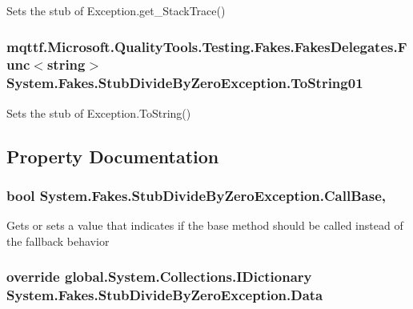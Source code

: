 Sets the stub of Exception.\-get\-\_\-\-Stack\-Trace()

\hypertarget{class_system_1_1_fakes_1_1_stub_divide_by_zero_exception_aeb8a3ab45380ba167acf6766766ca596}{
\subsubsection[{To\-String01}]{\setlength{\rightskip}{0pt plus 5cm}mqttf.\-Microsoft.\-Quality\-Tools.\-Testing.\-Fakes.\-Fakes\-Delegates.\-Func$<$string$>$ System.\-Fakes.\-Stub\-Divide\-By\-Zero\-Exception.\-To\-String01}}\label{class_system_1_1_fakes_1_1_stub_divide_by_zero_exception_aeb8a3ab45380ba167acf6766766ca596}


Sets the stub of Exception.\-To\-String()



\subsection{Property Documentation}
\hypertarget{class_system_1_1_fakes_1_1_stub_divide_by_zero_exception_a241ea289fc72c08d879994894e726743}{
\subsubsection[{Call\-Base}]{\setlength{\rightskip}{0pt plus 5cm}bool System.\-Fakes.\-Stub\-Divide\-By\-Zero\-Exception.\-Call\-Base\hspace{0.3cm}{\ttfamily [get]}, {\ttfamily [set]}}}\label{class_system_1_1_fakes_1_1_stub_divide_by_zero_exception_a241ea289fc72c08d879994894e726743}


Gets or sets a value that indicates if the base method should be called instead of the fallback behavior

\hypertarget{class_system_1_1_fakes_1_1_stub_divide_by_zero_exception_a874380dae135ea32926dd1e1d2646a65}{
\subsubsection[{Data}]{\setlength{\rightskip}{0pt plus 5cm}override global.\-System.\-Collections.\-I\-Dictionary System.\-Fakes.\-Stub\-Divide\-By\-Zero\-Exception.\-Data\hspace{0.3cm}{\ttfamily [get]}}}\label{class_system_1_1_fakes_1_1_stub_divide_by_zero_exception_a874380dae135ea32926dd1e1d2646a65}


